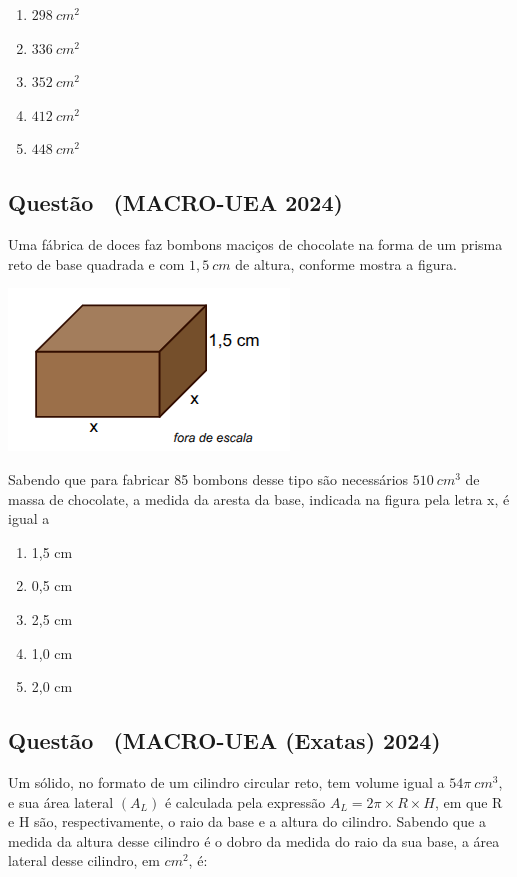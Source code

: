 \documentclass[12pt]{article}
\newcounter{questao}
\newcommand{\novaquestao}[1]{%
  \stepcounter{questao}%
  \subsection*{Questão \thequestao\ (#1)}%
}
\begin{document}
\begin{multicols}{2}
            \begin{enumerate}[label=(\alph*), noitemsep]
                \item {$298\ cm^{2}$} %
                \item $336\ cm^{2}$
                \item $352\ cm^{2}$
                \item $412\ cm^{2}$
                \item $448\ cm^{2}$
            \end{enumerate}
            
        \novaquestao{MACRO-UEA 2024}
            Uma fábrica de doces faz bombons maciços de chocolate na forma de um prisma reto de base quadrada e com $1,5\ cm$ de altura, conforme mostra a figura.

            \begin{center}
                \includegraphics[scale=0.6]{q24.png}
            \end{center} Sabendo que para fabricar 85 bombons desse tipo são necessários $510\ cm^{3}$ de massa de chocolate, a medida da aresta da base, indicada na figura pela letra x, é igual a
        
            \begin{enumerate}[label=(\alph*), noitemsep]
                \item 1,5  cm
                \item 0,5  cm
                \item 2,5  cm
                \item 1,0  cm
                \item {2,0  cm} %
            \end{enumerate}

        \novaquestao{MACRO-UEA (Exatas) 2024}

            Um sólido, no formato de um cilindro circular reto, tem volume igual a $54\pi\ cm^{3}$, e sua área lateral $(A_{L})$ é calculada pela expressão $A_{L}=2\pi \times R \times H$, em que R e H são, respectivamente, o raio da base e a altura do cilindro. Sabendo que a medida da altura desse cilindro é o dobro da medida do raio da sua base, a área lateral desse cilindro, em $cm^{2}$, é:
            

\end{multicols}
\end{document}
